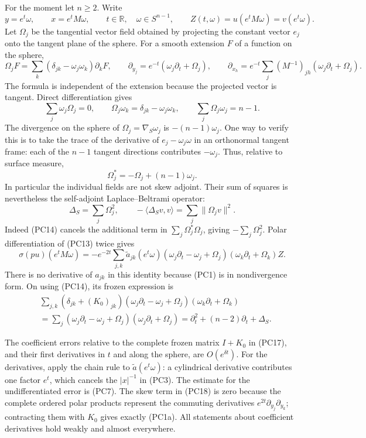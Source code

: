 \documentclass[
  11pt,
]{article}
\begin{document}
For the moment let \(n\geq2\). Write \[
y=e^t\omega,\qquad x=e^tM\omega,\qquad
t\in\mathbb R,\quad\omega\in S^{n-1},\qquad
Z(t,\omega)=u(e^tM\omega)=v(e^t\omega).
\tag{PC12}
\] Let \(\Omega_j\) be the tangential vector field obtained by
projecting the constant vector \(e_j\) onto the tangent plane of the
sphere. For a smooth extension \(F\) of a function on the sphere, \[
\Omega_jF=\sum_k(\delta_{jk}-\omega_j\omega_k)\partial_kF,
\qquad
\partial_{y_j}=e^{-t}(\omega_j\partial_t+\Omega_j),\qquad
\partial_{x_h}=e^{-t}\sum_j(M^{-1})_{jh}
                                      (\omega_j\partial_t+\Omega_j).
\tag{PC13}
\] The formula is independent of the extension because the projected
vector is tangent. Direct differentiation gives \[
\sum_j\omega_j\Omega_j=0,\qquad
\Omega_j\omega_k=\delta_{jk}-\omega_j\omega_k,\qquad
\sum_j\Omega_j\omega_j=n-1.
\tag{PC14}
\] The divergence on the sphere of \(\Omega_j=\nabla_S\omega_j\) is
\(-(n-1)\omega_j\). One way to verify this is to take the trace of the
derivative of \(e_j-\omega_j\omega\) in an orthonormal tangent frame:
each of the \(n-1\) tangent directions contributes \(-\omega_j\). Thus,
relative to surface measure, \[
\Omega_j^*=-\Omega_j+(n-1)\omega_j.
\tag{PC15}
\] In particular the individual fields are not skew adjoint. Their sum
of squares is nevertheless the self-adjoint Laplace--Beltrami operator:
\[
\Delta_S=\sum_j\Omega_j^2,\qquad
-\langle\Delta_Sv,v\rangle=\sum_j\|\Omega_jv\|^2.
\tag{PC16}
\] Indeed (PC14) cancels the additional term in
\(\sum_j\Omega_j^*\Omega_j\), giving \(-\sum_j\Omega_j^2\). Polar
differentiation of (PC13) twice gives \[
\sigma(pu)(e^tM\omega)
 =-e^{-2t}\sum_{j,k}\widetilde a_{jk}(e^t\omega)
 (\omega_j\partial_t-\omega_j+\Omega_j)
 (\omega_k\partial_t+\Omega_k)Z.
\tag{PC17}
\] There is no derivative of \(a_{jk}\) in this identity because (PC1)
is in nondivergence form. On using (PC14), its frozen expression is \[
\begin{split}
 &\sum_{j,k}(\delta_{jk}+(K_0)_{jk})
       (\omega_j\partial_t-\omega_j+\Omega_j)
       (\omega_k\partial_t+\Omega_k)\\
 &=\sum_j(\omega_j\partial_t-\omega_j+\Omega_j)
       (\omega_j\partial_t+\Omega_j)
 =\partial_t^2+(n-2)\partial_t+\Delta_S.
 \end{split}
\tag{PC18}
\]

The coefficient errors relative to the complete frozen matrix \(I+K_0\)
in (PC17), and their first derivatives in \(t\) and along the sphere,
are \(O(e^{\delta t})\). For the derivatives, apply the chain rule to
\(\widetilde a(e^t\omega)\): a cylindrical derivative contributes one
factor \(e^t\), which cancels the \(|x|^{-1}\) in (PC3). The estimate
for the undifferentiated error is (PC7). The skew term in (PC18) is zero
because the complete ordered polar products represent the commuting
derivatives \(e^{2t}\partial_{y_j}\partial_{y_k}\); contracting them
with \(K_0\) gives exactly (PC1a). All statements about coefficient
derivatives hold weakly and almost everywhere.
\end{document}
